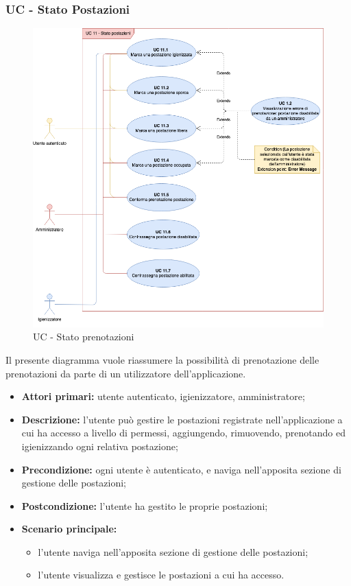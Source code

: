 \subsubsection{UC - Stato Postazioni}

\begin{figure}[h]
  \centering
    \includegraphics[scale=0.5]{src/CasiDUso/Immagini/UC11.png}
  \caption{UC  - Stato prenotazioni}
\end{figure}

Il presente diagramma vuole riassumere la possibilità di prenotazione delle prenotazioni da parte di un utilizzatore dell’applicazione.

\begin{itemize}
\item \textbf{Attori primari:} utente autenticato, igienizzatore, amministratore;
\item \textbf{Descrizione:} l’utente può gestire le postazioni registrate nell’applicazione a cui ha accesso a livello di permessi, aggiungendo, rimuovendo, prenotando ed igienizzando ogni relativa postazione;
\item \textbf{Precondizione:} ogni utente è autenticato, e naviga nell’apposita sezione di gestione delle postazioni;
\item \textbf{Postcondizione:} l’utente ha gestito le proprie postazioni;
\item \textbf{Scenario principale:} 
	\begin{itemize}
		\item l’utente naviga nell’apposita sezione di gestione delle postazioni;
		\item l’utente visualizza e gestisce le postazioni a cui ha accesso.
	\end{itemize}
\end{itemize}


